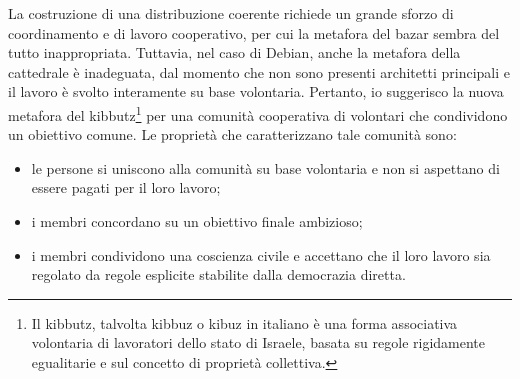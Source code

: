\documentclass[a4paper,12pt,titlepage,oneside]{book}
\begin{document}
    La costruzione di una distribuzione coerente richiede un grande sforzo di coordinamento e di lavoro cooperativo, per cui la metafora del bazar sembra del tutto inappropriata. Tuttavia, nel
    caso di Debian, anche la metafora della cattedrale è inadeguata, dal momento che non sono presenti architetti principali e il lavoro è svolto interamente su base volontaria. Pertanto, io suggerisco la nuova metafora del kibbutz\footnote{Il kibbutz, 
    talvolta kibbuz o kibuz in italiano è una forma associativa volontaria di lavoratori dello stato di Israele,  basata su regole rigidamente egualitarie e sul concetto di proprietà collettiva.}
    per una comunità cooperativa di volontari che condividono un obiettivo comune. Le proprietà che caratterizzano tale comunità sono:
    
\begin{itemize}
    \item le persone si uniscono alla comunità su base volontaria e non si aspettano di essere pagati per il 
    loro lavoro;
    \item i membri concordano su un obiettivo finale ambizioso;
    \item i membri condividono una coscienza civile e accettano che il loro lavoro sia regolato da regole esplicite
    stabilite dalla democrazia diretta.
\end{itemize}
\end{document}
